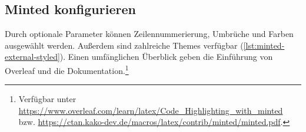 
\subsection{Minted konfigurieren}

Durch optionale Parameter können Zeilennummerierung, Umbrüche und Farben ausgewählt werden. 
Außerdem sind zahlreiche Themes verfügbar (\cref{lst:minted-external-styled}).
Einen umfänglichen Überblick geben die Einführung von Overleaf und die Dokumentation.\footnote{Verfügbar unter \url{https://www.overleaf.com/learn/latex/Code_Highlighting_with_minted} bzw. \url{https://ctan.kako-dev.de/macros/latex/contrib/minted/minted.pdf}.}

